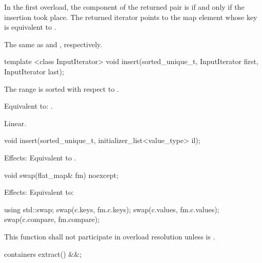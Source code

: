\begin{codeblock}
\begin{codeblock}
\begin{codeblock}
\begin{addedblock}
\begin{itemdescr}
\pnum
\returns
In the first overload,
the  component of the returned pair is 
if and only if the insertion took place.
The returned iterator points to the map element
whose key is equivalent to .

\pnum
\complexity
The same as  and ,
respectively.
\end{itemdescr}

%
\begin{itemdecl}
template <class InputIterator>
  void insert(sorted_unique_t, InputIterator first, InputIterator last);
\end{itemdecl}

\begin{itemdescr}
\pnum \expects
The range  is sorted with respect to .

\pnum \effects Equivalent to: .

\pnum \complexity Linear.
\end{itemdescr}


%
\begin{itemdecl}
void insert(sorted_unique_t, initializer_list<value_type> il);
\end{itemdecl}

\begin{itemdescr}
\pnum Effects: Equivalent to .
\end{itemdescr}

%
\begin{itemdecl}
void swap(flat_map& fm) noexcept;
\end{itemdecl}

\begin{itemdescr}
\pnum Effects: Equivalent to:
\begin{codeblock}
using std::swap;
swap(c.keys, fm.c.keys);
swap(c.values, fm.c.values);
swap(c.compare, fm.compare);
\end{codeblock}

\pnum
\remarks
This function shall not participate in overload resolution
unless  is
.
\end{itemdescr}

%
\begin{itemdecl}
containers extract() &&;
\end{itemdecl}


\end{addedblock}
\end{codeblock}
\end{codeblock}
\end{codeblock}

